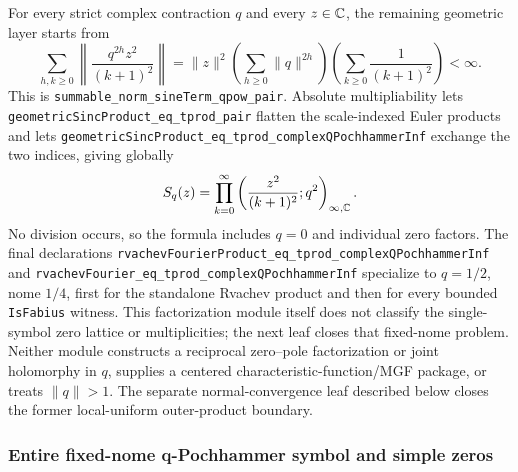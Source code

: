 \documentclass[11pt,oneside]{article}
\theoremstyle{definition}
\theoremstyle{remark}
\begin{document}
For every strict complex contraction \(q\) and every \(z\in\mathbb{C}\),
the remaining geometric layer starts from
\[
 \sum_{h,k\ge0}
 \left\lVert\frac{q^{2h}z^2}{(k+1)^2}\right\rVert
 =\lVert z\rVert^2
  \left(\sum_{h\ge0}\lVert q\rVert^{2h}\right)
  \left(\sum_{k\ge0}\frac1{(k+1)^2}\right)<\infty.
\]
This is \nolinkurl{summable_norm_sineTerm_qpow_pair}.  Absolute
multipliability lets \nolinkurl{geometricSincProduct_eq_tprod_pair} flatten the
scale-indexed Euler products and lets
\nolinkurl{geometricSincProduct_eq_tprod_complexQPochhammerInf} exchange the
two indices, giving globally
\[
 S_q(z)=\prod_{k=0}^{\infty}
 \left(\frac{z^2}{(k+1)^2};q^2\right)_{\infty,\mathbb{C}}.
\]
No division occurs, so the formula includes \(q=0\) and individual zero
factors.  The final declarations
\nolinkurl{rvachevFourierProduct_eq_tprod_complexQPochhammerInf} and
\nolinkurl{rvachevFourier_eq_tprod_complexQPochhammerInf} specialize to
\(q=1/2\), nome \(1/4\), first for the standalone Rvachev product and then for
every bounded \nolinkurl{IsFabius} witness.  This factorization module itself
does not classify the single-symbol zero lattice or multiplicities; the next
leaf closes that fixed-nome problem.  Neither module constructs a reciprocal
zero--pole factorization or joint holomorphy in \(q\), supplies a centered
characteristic-function/MGF package, or treats \(\lVert q\rVert>1\).  The
separate normal-convergence leaf described below closes the former
local-uniform outer-product boundary.

\subsubsection{Entire fixed-nome q-Pochhammer symbol and simple zeros}
\label{ch:qpochhammer-entire}
\end{document}
